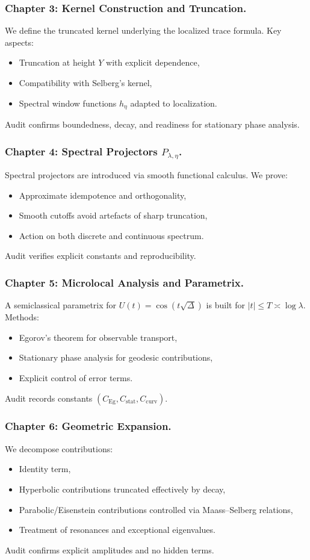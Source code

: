 \subsubsection*{Chapter 3: Kernel Construction and Truncation.}
We define the truncated kernel underlying the localized trace formula.
Key aspects:
\begin{itemize}
  \item Truncation at height $Y$ with explicit dependence,
  \item Compatibility with Selberg’s kernel,
  \item Spectral window functions $h_\eta$ adapted to localization.
\end{itemize}
Audit confirms boundedness, decay, and readiness for stationary phase analysis.

\subsubsection*{Chapter 4: Spectral Projectors $P_{\lambda,\eta}$.}
Spectral projectors are introduced via smooth functional calculus.
We prove:
\begin{itemize}
  \item Approximate idempotence and orthogonality,
  \item Smooth cutoffs avoid artefacts of sharp truncation,
  \item Action on both discrete and continuous spectrum.
\end{itemize}
Audit verifies explicit constants and reproducibility.

\subsubsection*{Chapter 5: Microlocal Analysis and Parametrix.}
A semiclassical parametrix for $U(t)=\cos(t\sqrt{\Delta})$ is built for $|t|\le T\asymp\log\lambda$.
Methods:
\begin{itemize}
  \item Egorov’s theorem for observable transport,
  \item Stationary phase analysis for geodesic contributions,
  \item Explicit control of error terms.
\end{itemize}
Audit records constants $(C_{\mathrm{Eg}}, C_{\mathrm{stat}}, C_{\mathrm{curv}})$.

\subsubsection*{Chapter 6: Geometric Expansion.}
We decompose contributions:
\begin{itemize}
  \item Identity term,
  \item Hyperbolic contributions truncated effectively by decay,
  \item Parabolic/Eisenstein contributions controlled via Maass–Selberg relations,
  \item Treatment of resonances and exceptional eigenvalues.
\end{itemize}
Audit confirms explicit amplitudes and no hidden terms.


